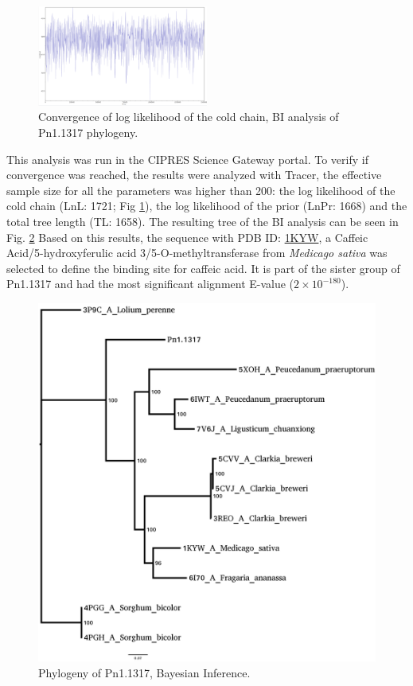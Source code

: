 \documentclass[12pt]{article}
\begin{document}
	\FloatBarrier
	\begin{figure}
		\centering
		\includegraphics[width=0.5\textwidth]{../4/Phylogeny/trace.png}
		\caption[Convergence of lnL, BI analysis of Pn1.1317.]{Convergence of log likelihood of the cold chain, BI analysis of Pn1.1317 phylogeny.}
		\label{fig4_4}
	\end{figure}
	\FloatBarrier


	This analysis was run in the CIPRES Science Gateway portal. \cite{cipres} To verify if convergence was reached, the results were analyzed with Tracer, the effective sample size for all the parameters was higher than 200: the log likelihood of the
	cold chain (LnL: 1721; Fig \ref{fig4_4}), the log likelihood of the prior (LnPr: 1668) and the total tree length (TL: 1658). \cite{tracer}
	The resulting tree of the BI analysis can be seen in Fig. \ref{fig4_5} Based on this results, the sequence with PDB ID: \href{https://www.rcsb.org/structure/1KYW}{1KYW}, a Caffeic Acid/5-hydroxyferulic acid 3/5-O-methyltransferase from \textit{Medicago sativa} was selected to define the binding site for caffeic acid. It is part of the sister group of Pn1.1317 and had the most significant alignment E-value ($2\times10^{-180}$). 
	

	\FloatBarrier
	\begin{figure}
		\centering
		\includegraphics[width=0.5\textwidth-10pt]{../4/Phylogeny/tree.png}
		\caption{Phylogeny of Pn1.1317, Bayesian Inference.}
		\label{fig4_5}
	\end{figure}
	\FloatBarrier
	
\end{document}
